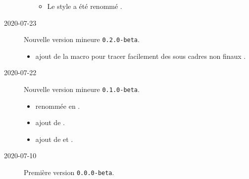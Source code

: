 \documentclass[12pt,a4paper]{article}
\begin{document}
\begin{description}
\begin{itemize}[itemsep=.5em]
\begin{itemize}[itemsep=.5em]
            \item Le style  a été renommé .
        \end{itemize}
    \end{itemize}
    
    \separation

    \medskip
    \item[2020-07-23] Nouvelle version mineure \verb+0.2.0-beta+.
    
    \begin{itemize}[itemsep=.5em]
        \item {}
              ajout de la macro  pour tracer facilement des sous cadres non \og finaux \fg.
    \end{itemize}
    
    \separation

    \medskip
    \item[2020-07-22] Nouvelle version mineure \verb+0.1.0-beta+.
    
    \begin{itemize}[itemsep=.5em]
        \item {}
               renommée en  .
    
        \item {}
              ajout de .
    
        \item {}
              ajout de  et .
    \end{itemize}
    
    \separation

    \medskip
    \item[2020-07-10] Première version \verb+0.0.0-beta+.

\end{description}
\end{document}
